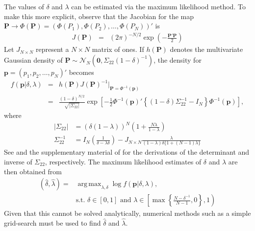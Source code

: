 \documentclass[11pt]{article}
\DeclareMathOperator*{\argmax}{arg\,max}
\theoremstyle{definition}
\theoremstyle{definition}
\begin{document}
The values of $\delta$ and $\lambda$ can be estimated via the maximum likelihood method. To make this more explicit, observe that the Jacobian for the map $\boldsymbol{P} \to \Phi\left(\boldsymbol{P}\right) = (\Phi(P_1), \Phi(P_2), \dots, \Phi(P_N))'$ is
\begin{eqnarray*}
J(\boldsymbol{P}) &=& (2\pi)^{-N/2} \exp \left( - \frac{\boldsymbol{P}' \boldsymbol{P}}{2}   \right) 
\end{eqnarray*}
%
Let $J_{N \times N}$ represent a $N\times N$ matrix of ones. If $h(\boldsymbol{P})$ denotes the multivariate Gaussian density of $\boldsymbol{P} \sim \mathcal{N}_N\left(\boldsymbol{0}, \Sigma_{22} (1-\delta)^{-1}\right)$,
the density for  $\boldsymbol{p} = (p_1, p_2, \dots, p_N)'$ becomes
\begin{eqnarray*}
 f\left(\boldsymbol{p} | \delta, \lambda \right) &=& h(\boldsymbol{P}) J(\boldsymbol{P})^{-1} \bigg|_{\boldsymbol{P} = \Phi^{-1}(\boldsymbol{p})}\\
&=& \frac{(1-\delta)^{N/2}}{\sqrt{ \left|\Sigma_{22}\right|}} \exp\left[ -\frac{1}{2} \Phi^{-1}(\boldsymbol{p})' \left\{ (1-\delta) \Sigma_{22}^{-1} - I_N \right\} \Phi^{-1}(\boldsymbol{p})  \right],
\end{eqnarray*}
where
\begin{align}
\left| \Sigma_{22}\right| &= (\delta(1- \lambda))^N \left(1+\frac{N \lambda}{1 - \lambda} \right) \nonumber\\
\Sigma_{22}^{-1} &= I_N \left(\frac{1}{\delta-\lambda\delta} \right) - J_{N \times N} \frac{\lambda}{(1-\lambda)\delta\{1+(N-1) \lambda\}} \label{inverse}
\end{align}
See \cite{rao2009linear} and the supplementary material of \cite{dobbin2005sample} for the derivations of the determinant and inverse of $\Sigma_{22}$, respectively. The maximum likelihood estimates of $\delta$ and $\lambda$ are then obtained from
\begin{align*}
\left(\hat{\delta}, \hat{\lambda}\right) =& \argmax_{\lambda, \delta} \log  f\left(\boldsymbol{p}| \delta, \lambda \right),\\
& \text{s.t. } \nonumber \delta \in [0,1] \text{ and } \lambda \in \left[  \max \left\{ \frac{N-\delta^{-1}}{N-1}, 0\right\}, 1 \right)
\end{align*}
Given that this cannot be solved analytically, numerical methods such as a simple grid-search must be used to find $\hat{\delta}$ and $\hat{\lambda}$. 

% 


%
\end{document}
